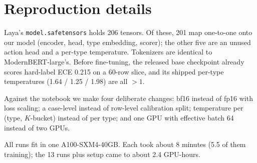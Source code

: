 \documentclass[conference]{IEEEtran}
\begin{document}
\section{Reproduction details}
\label{app:repro}

Laya's \texttt{model.safetensors} holds 206 tensors. Of these, 201 map
one-to-one onto our model (encoder, head, type embedding, scorer); the other
five are an unused action head and a per-type temperature. Tokenizers are
identical to ModernBERT-large's. Before fine-tuning, the released base
checkpoint already scores hard-label ECE 0.215 on a 60-row slice, and its
shipped per-type temperatures (1.64 / 1.25 / 1.98) are all $>1$.

Against the notebook we make four deliberate changes: bf16 instead of fp16 with
loss scaling; a case-level instead of row-level calibration split; temperature
per (type, $K$-bucket) instead of per type; and one GPU with effective batch
64 instead of two GPUs.

All runs fit in one A100-SXM4-40GB. Each took about 8 minutes (5.5 of them
training); the 13 runs plus setup came to about 2.4 GPU-hours.

\begin{table}[h]
\caption{All E2 runs (test set; raw logits).}
\label{tab:allruns}
\centering
\scriptsize
\setlength{\tabcolsep}{2.4pt}
\end{table}
\end{document}
